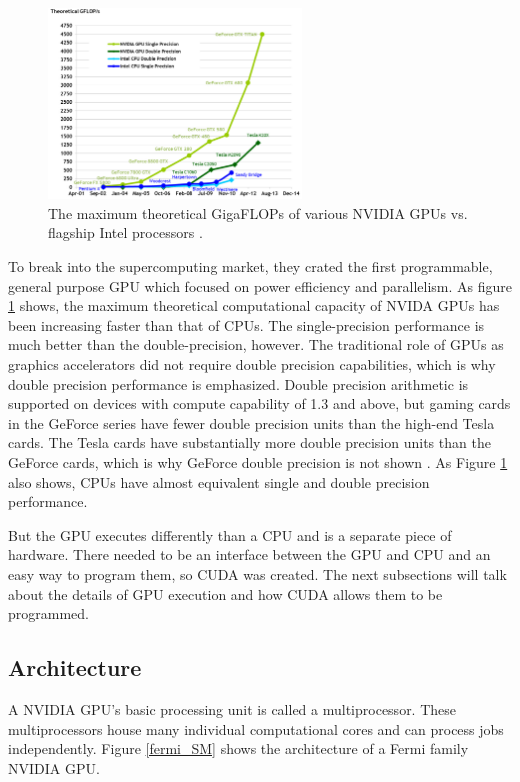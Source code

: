 \begin{figure}[h!] 
  \centering
    \includegraphics[width=0.6\textwidth]{graphics/computational_cap.pdf}
     \caption{The maximum theoretical GigaFLOPs of various NVIDIA GPUs vs. flagship Intel processors \cite{cuda}. \label{computational_cap}}
\end{figure}

To break into the supercomputing market, they crated the first programmable, general purpose GPU which focused on power efficiency and parallelism.  As figure \ref{computational_cap} shows, the maximum theoretical computational capacity of NVIDA GPUs has been increasing faster than that of CPUs.  The single-precision performance is much better than the double-precision, however.  The traditional role of GPUs as graphics accelerators did not require double precision capabilities, which is why double precision performance is emphasized.  Double precision arithmetic is supported on devices with compute capability of 1.3 and above, but gaming cards in the GeForce series have fewer double precision units than the high-end Tesla cards.  The Tesla cards have substantially more double precision units than the GeForce cards, which is why GeForce double precision is not shown \cite{fermi}.  As Figure \ref{computational_cap} also shows, CPUs have almost equivalent single and double precision performance. 

But the GPU executes differently than a CPU and is a separate piece of hardware.  There needed to be an interface between the GPU and CPU and an easy way to program them, so CUDA was created.  The next subsections will talk about the details of GPU execution and how CUDA allows them to be programmed. 

\subsection{Architecture}

A NVIDIA GPU's basic processing unit is called a multiprocessor.  These multiprocessors house many individual computational cores and can process jobs independently.  Figure \ref{fermi_SM} shows the architecture of a Fermi family NVIDIA GPU.  

